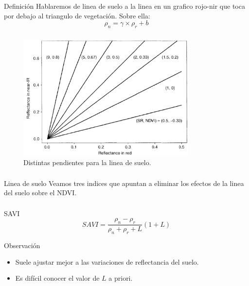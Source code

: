 \documentclass[handout]{beamer}
\begin{document}
\begin{frame}
    \frametitle{\subsecname}
     \begin{block}{Definici\'on}
        Hablaremos de linea de suelo a la linea en un grafico rojo-nir que toca
        por debajo al triangulo de vegetaci\'on. Sobre ella:
         \begin{equation}
             \rho_n = \gamma \times \rho_r +b
         \end{equation}
     \end{block}
\end{frame}

\begin{frame}
    \frametitle{\subsecname}
    \begin{figure}
    \begin{center}
        \includegraphics[width=0.8\textwidth]{imagenes/soiline.png}
    \end{center}
        \caption{Distintas pendientes para la linea de
        suelo.}
    \end{figure}
\end{frame}

\begin{frame}
    \frametitle{\subsecname}
    \begin{block}{Linea de suelo}
        Veamos tres indices que apuntan a eliminar los efectos de la linea del
        suelo sobre el NDVI.
    \end{block}
\end{frame}

\begin{frame}
    \frametitle{\subsecname}
    \begin{block}{SAVI}
        \begin{equation}
            SAVI = \frac{\rho_n-\rho_r}{\rho_n+\rho_r+L}(1+L)
        \end{equation}
    \end{block}\pause
    \begin{block}{Observaci\'on}
        \begin{itemize}[<+->]
            \item Suele ajustar mejor a las variaciones de reflectancia del
                suelo.
            \item Es dif\'icil conocer el valor de $L$ a priori.
        \end{itemize}
    \end{block}
\end{frame}
\end{document}
